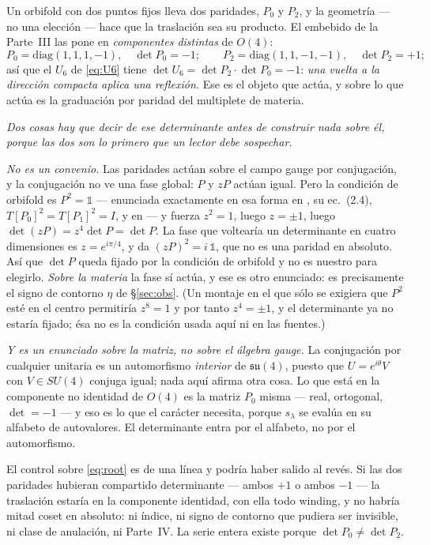 \documentclass[11pt,a4paper]{article}
\newcommand{\one}{\mathds{1}}
\newcommand{\su}[1]{SU(#1)}
\begin{document}
Un orbifold con dos puntos fijos lleva dos paridades, $P_0$ y $P_2$, y la geometría --- no una
elección --- hace que la traslación sea su producto. El embebido de la Parte~III las pone en
\emph{componentes distintas} de $O(4)$:
\begin{equation}\label{eq:root}
P_0=\mathrm{diag}(1,1,1,-1),\quad \det P_0=-1;
\qquad
P_2=\mathrm{diag}(1,1,-1,-1),\quad \det P_2=+1;
\end{equation}
así que el $U_6$ de \eqref{eq:U6} tiene $\det U_6=\det P_2\cdot\det P_0=-1$: \emph{una vuelta a la
dirección compacta aplica una reflexión.} Ese es el objeto que actúa, y sobre lo que actúa es la
graduación por paridad del multiplete de materia.

\emph{Dos cosas hay que decir de ese determinante antes de construir nada sobre él, porque las dos
son lo primero que un lector debe sospechar.}

\emph{No es un convenio.} Las paridades actúan sobre el campo gauge por conjugación, y la conjugación
no ve una fase global: $P$ y $zP$ actúan igual. Pero la condición de orbifold es $P^2=\one$ ---
enunciada exactamente en esa forma en \cite{HHK}, su ec.~(2.4), $T[P_0]^2=T[P_1]^2=I$, y en
\cite{KKKY} --- y fuerza $z^2=1$, luego $z=\pm1$, luego $\det(zP)=z^4\det P=\det P$. La fase que
voltearía un determinante en cuatro dimensiones es $z=e^{i\pi/4}$, y da $(zP)^2=i\,\one$, que no
es una paridad en absoluto. Así que $\det P$ queda fijado por la condición de orbifold y no es
nuestro para elegirlo. \emph{Sobre la materia} la fase sí actúa, y ese es otro enunciado: es
precisamente el signo de contorno $\eta$ de \S\ref{sec:obs}. (Un montaje en el que sólo se exigiera
que $P^2$ esté en el centro permitiría $z^8=1$ y por tanto $z^4=\pm1$, y el determinante ya no
estaría fijado; ésa no es la condición usada aquí ni en las fuentes.)

\emph{Y es un enunciado sobre la matriz, no sobre el álgebra gauge.} La conjugación por cualquier
unitaria es un automorfismo \emph{interior} de $\mathfrak{su}(4)$, puesto que $U=e^{i\theta}V$ con
$V\in\su4$ conjuga igual; nada aquí afirma otra cosa. Lo que está en la componente no identidad de
$O(4)$ es la matriz $P_0$ misma --- real, ortogonal, $\det=-1$ --- y eso es lo que el carácter
necesita, porque $s_\lambda$ se evalúa en su alfabeto de autovalores. El determinante entra por el
alfabeto, no por el automorfismo.

El control sobre \eqref{eq:root} es de una línea y podría haber salido al revés. Si las dos paridades
hubieran compartido determinante --- ambos $+1$ o ambos $-1$ --- la traslación estaría en la
componente identidad, con ella todo winding, y no habría mitad coset en absoluto: ni índice, ni
signo de contorno que pudiera ser invisible, ni clase de anulación, ni Parte~IV. La serie entera
existe porque $\det P_0\neq\det P_2$.
\end{document}
